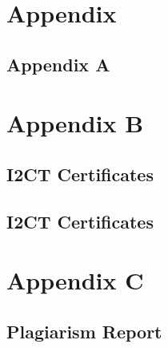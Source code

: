 \appendix
\begin{appendices}

\section{Appendix}
\subsection{Appendix A }



\newpage
\section{Appendix B}
%
\subsection{I2CT Certificates}
\subsection{I2CT Certificates}
\begin{figure}[h!]
\centering
\end{figure}

\newpage
\section{Appendix C}
\subsection{Plagiarism Report }

\end{appendices}


